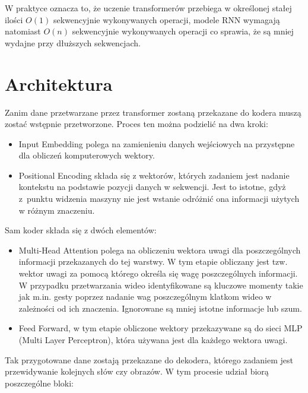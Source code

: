 \documentclass[12pt,a4paper,twoside]{book} %
\begin{document}
W praktyce oznacza to, że uczenie transformerów przebiega w określonej stałej ilości $O(1)$ sekwencyjnie wykonywanych operacji, modele RNN wymagają natomiast $O(n)$ sekwencyjnie wykonywanych operacji co sprawia, że są mniej wydajne przy dłuższych sekwencjach.

\pagebreak

\section{Architektura}

Zanim dane przetwarzane przez transformer zostaną przekazane do kodera muszą zostać wstępnie przetworzone. Proces ten można podzielić na dwa kroki:
\begin{itemize}
    \item Input Embedding polega na zamienieniu danych wejściowych na przystępne dla obliczeń komputerowych wektory.
    \item Positional Encoding składa się z wektorów, których zadaniem jest nadanie kontekstu na podstawie pozycji danych w sekwencji. Jest to istotne, gdyż z~punktu widzenia maszyny nie jest wstanie odróżnić ona informacji użytych w różnym znaczeniu. 
\end{itemize}
Sam koder składa się z dwóch elementów:
\begin{itemize}
    \item Multi-Head Attention polega na obliczeniu wektora uwagi dla poszczególnych informacji przekazanych do tej warstwy. W tym etapie obliczany jest tzw. wektor uwagi za pomocą którego określa się wagę poszczególnych informacji. W przypadku przetwarzania wideo identyfikowane są kluczowe momenty takie jak m.in. gesty poprzez nadanie wag poszczególnym klatkom wideo w zależności od ich znaczenia. Ignorowane są mniej istotne informacje lub szum.
    \item Feed Forward, w tym etapie obliczone wektory przekazywane są do sieci MLP (Multi Layer Perceptron), która używana jest dla każdego wektora uwagi.
\end{itemize}
Tak przygotowane dane zostają przekazane do dekodera, którego zadaniem jest przewidywanie kolejnych słów czy obrazów. W tym procesie udział biorą poszczególne bloki:
\end{document}
